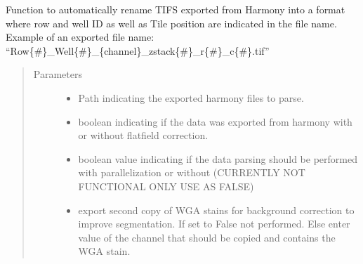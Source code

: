 \documentclass[a4paper,10pt,english,openany,oneside]{sphinxmanual}
\begin{document}
\begin{fulllineitems}
\label{\detokenize{pages/modules:vipertools.parse.parse_phenix}}
\sphinxAtStartPar
Function to automatically rename TIFS exported from Harmony into a format where row and well ID as well as Tile position are indicated in the file name.
Example of an exported file name: “Row\{\#\}\_Well\{\#\}\_\{channel\}\_zstack\{\#\}\_r\{\#\}\_c\{\#\}.tif”
\begin{quote}\begin{description}
\item[{Parameters}] \leavevmode\begin{itemize}
\item {} 
\sphinxAtStartPar
{} \textendash{} Path indicating the exported harmony files to parse.

\item {} 
\sphinxAtStartPar
{} \textendash{} boolean indicating if the data was exported from harmony with or without flatfield correction.

\item {} 
\sphinxAtStartPar
{} \textendash{} boolean value indicating if the data parsing should be performed with parallelization or without (CURRENTLY NOT FUNCTIONAL ONLY USE AS FALSE)

\item {} 
\sphinxAtStartPar
{} \textendash{} export second copy of WGA stains for background correction to improve segmentation. If set to False not performed. Else enter value of the channel
that should be copied and contains the WGA stain.

\end{itemize}

\end{description}\end{quote}

\end{fulllineitems}

\label{\detokenize{pages/modules:module-vipertools.stitch}}
\end{document}
